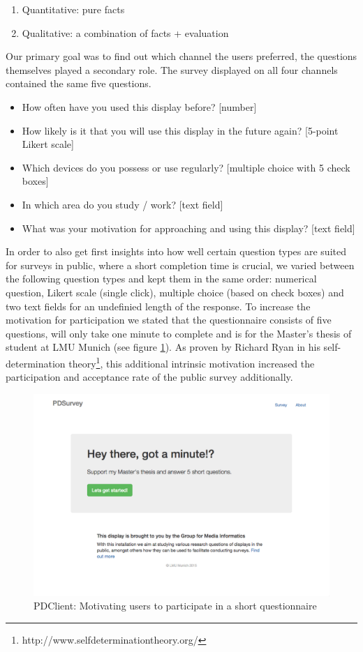 	\begin{enumerate}
	\item Quantitative: pure facts
	\item Qualitative: a combination of facts + evaluation
	\end{enumerate}


	Our primary goal was to find out which channel the users preferred, the questions themselves played a secondary role. The survey displayed on all four channels contained the same five questions. 

	\begin{itemize}
	\item How often have you used this display before? [number]
	\item How likely is it that you will use this display in the future again? [5-point Likert scale]
	\item Which devices do you possess or use regularly? [multiple choice with 5 check boxes]
	\item In which area do you study / work? [text field]
	\item What was your motivation for approaching and using this display? [text field]
	\end{itemize}

	In order to also get first insights into how well certain question types are suited for surveys in public, where a short completion time is crucial, we varied between the following question types and kept them in the same order: numerical question, Likert scale (single click), multiple choice (based on check boxes) and two text fields for an undefinied length of the response. To increase the motivation for participation we stated that the questionnaire consists of five questions, will only take one minute to complete and is for the Master's thesis of student at LMU Munich (see figure \ref{fig:5-pdclient-intro}).
	As proven by Richard Ryan in his self-determination theory\cite{ryan2000self}\footnote{http://www.selfdeterminationtheory.org/}, this additional intrinsic motivation increased the participation and acceptance rate of the public survey additionally. 

	\begin{figure}
	    \begin{center}
	        \includegraphics[width=.7\columnwidth]{img/5_field-study/pdclient-startscreen.png}
	    \end{center}
	 \caption{PDClient: Motivating users to participate in a short questionnaire}
	 \label{fig:5-pdclient-intro}
	\end{figure}

